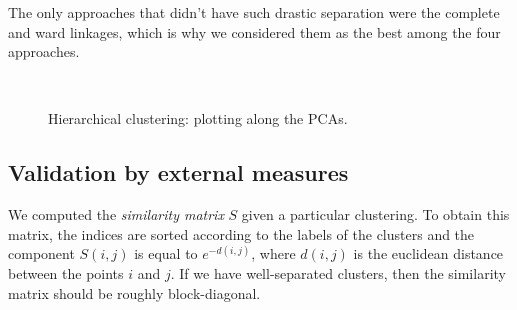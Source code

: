 The only approaches that didn't have such drastic separation were the complete and ward linkages, which is why we considered them as the best among the four approaches.
\begin{figure}[H]
    \centering
    \\
    \caption{Hierarchical clustering: plotting along the PCAs.}
    \label{fig:hier_clusters}
\end{figure}

\subsection{Validation by external measures}
We computed the \textit{similarity matrix} $S$ given a particular clustering. To obtain this matrix, the indices are sorted according to the labels of the clusters and the component $S(i,j)$ is equal to $e^{-d(i,j)}$, where $d(i,j)$ is the euclidean distance between the points $i$ and $j$. If we have well-separated clusters, then the similarity matrix should be roughly block-diagonal.
\vspace{3mm}

